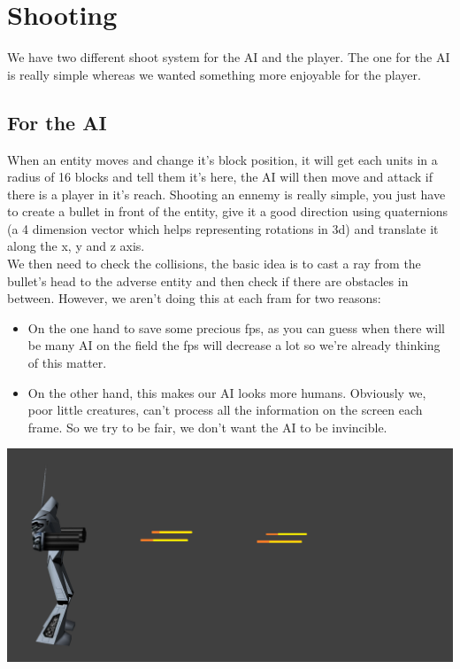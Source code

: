 \documentclass[article]{report}             %
\begin{document}
			\newpage
			\section{Shooting}
				We have two different shoot system for the AI and the player. The one for the AI is really simple whereas we wanted something more enjoyable for the player.


				\subsection{For the AI}
					When an entity moves and change it's block position, it will get each units in a radius of 16 blocks and tell them it's here, the AI will then move and attack if there is a player in it's reach. Shooting an ennemy is really simple, you just have to create a bullet in front of the entity, give it a good direction using quaternions (a 4 dimension vector which helps representing rotations in 3d) and translate it along the x, y and z axis.\\

					We then need to check the collisions, the basic idea is to cast a ray from the bullet's head to the adverse entity and then check if there are obstacles in between. However, we aren't doing this at each fram for two reasons:\\
					\begin{itemize}
						\item On the one hand to save some precious fps, as you can guess when there will be many AI on the field the fps will decrease a lot so we're already thinking of this matter.
						\item On the other hand, this makes our AI looks more humans. Obviously we, poor little creatures, can't process all the information on the screen each frame. So we try to be fair, we don't want the AI to be invincible.
					\end{itemize}
				\begin{center}
					\includegraphics[width = 15cm]{images/robotShoot.png}
				\end{center}
				
\end{document}

